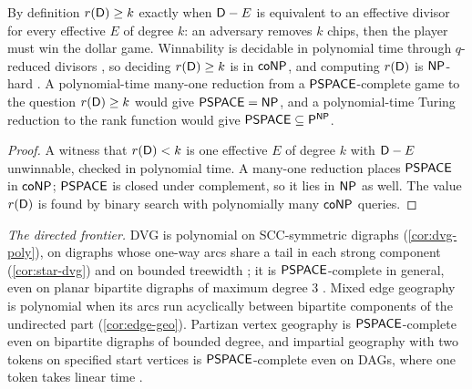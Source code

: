 \begin{proposition}\label{prop:rank-game}
By definition $r(\mathsf{D})\ge k$ exactly when $\mathsf{D}-E$ is equivalent to an effective divisor for every effective $E$ of degree $k$: an adversary removes $k$ chips, then the player must win the dollar game. Winnability is decidable in polynomial time through $q$-reduced divisors \cite{BakerNorine,BakerShokrieh}, so deciding $r(\mathsf{D})\ge k$ is in $\mathsf{coNP}$, and computing $r(\mathsf{D})$ is $\mathsf{NP}$-hard \cite{KissToth}. A polynomial-time many-one reduction from a $\mathsf{PSPACE}$-complete game to the question $r(\mathsf{D})\ge k$ would give $\mathsf{PSPACE}=\mathsf{NP}$, and a polynomial-time Turing reduction to the rank function would give $\mathsf{PSPACE}\subseteq\mathsf{P}^{\mathsf{NP}}$.
\end{proposition}
\begin{proof}
A witness that $r(\mathsf{D})<k$ is one effective $E$ of degree $k$ with $\mathsf{D}-E$ unwinnable, checked in polynomial time. A many-one reduction places $\mathsf{PSPACE}$ in $\mathsf{coNP}$; $\mathsf{PSPACE}$ is closed under complement, so it lies in $\mathsf{NP}$ as well. The value $r(\mathsf{D})$ is found by binary search with polynomially many $\mathsf{coNP}$ queries.
\end{proof}

\noindent\emph{The directed frontier.} DVG is polynomial on SCC-symmetric digraphs (\cref{cor:dvg-poly}), on digraphs whose one-way arcs share a tail in each strong component (\cref{cor:star-dvg}) and on bounded treewidth \cite{Bodlaender}; it is $\mathsf{PSPACE}$-complete in general, even on planar bipartite digraphs of maximum degree $3$ \cite{LichtensteinSipser}. Mixed edge geography is polynomial when its arcs run acyclically between bipartite components of the undirected part (\cref{cor:edge-geo}). Partizan vertex geography is $\mathsf{PSPACE}$-complete even on bipartite digraphs of bounded degree, and impartial geography with two tokens on specified start vertices is $\mathsf{PSPACE}$-complete even on DAGs, where one token takes linear time \cite{FraenkelSimonson}.

